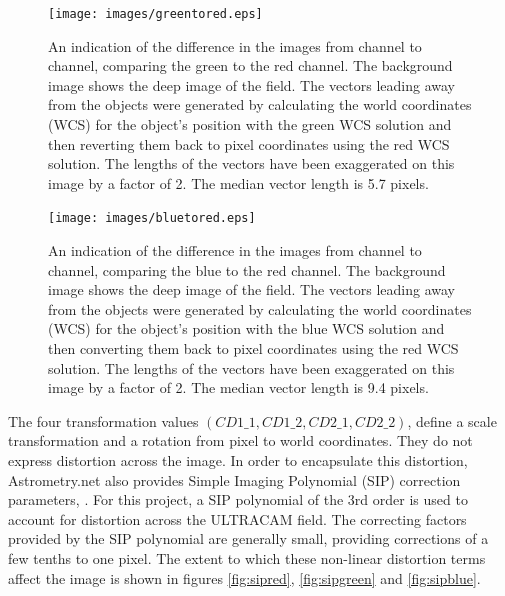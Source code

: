 \begin{figure}
  \centering
  \texttt{[image: images/greentored.eps]}
  \caption{An indication of the difference in the images from channel to channel,  comparing the green to the red channel. The background image shows the deep image of the field. The vectors leading away from the objects were generated by calculating the world coordinates (WCS) for the object's position with the green WCS solution and then reverting them back to pixel coordinates using the red WCS solution. The lengths of the vectors have been exaggerated on this image by a factor of 2. The median vector length is 5.7 pixels.}
\label{fig:greentored}
\end{figure}
  
\begin{figure}
  \centering
  \texttt{[image: images/bluetored.eps]}
  \caption{An indication of the difference in the images from channel to channel, comparing the blue to the red channel. The background image shows the deep image of the field. The vectors leading away from the objects were generated by calculating the world coordinates (WCS) for the object's position with the blue WCS solution and then converting them back to pixel coordinates using the red WCS solution. The lengths of the vectors have been exaggerated on this image by a factor of 2. The median vector length is 9.4 pixels.}
\label{fig:bluetored}
\end{figure}

The four transformation values $(CD1\_1, CD1\_2, CD2\_1, CD2\_2)$, define a scale transformation and a rotation from pixel to world coordinates. They do not express distortion across the image. In order to encapsulate this distortion, Astrometry.net also provides Simple Imaging Polynomial (SIP) correction parameters, \citep{sippolynomial}. For this project, a SIP polynomial of the 3rd order is used to account for distortion across the ULTRACAM field. The correcting factors provided by the SIP polynomial are generally small, providing corrections of a few tenths to one pixel. The extent to which these non-linear distortion terms affect the image is shown in figures \ref{fig:sipred}, \ref{fig:sipgreen} and \ref{fig:sipblue}. 

